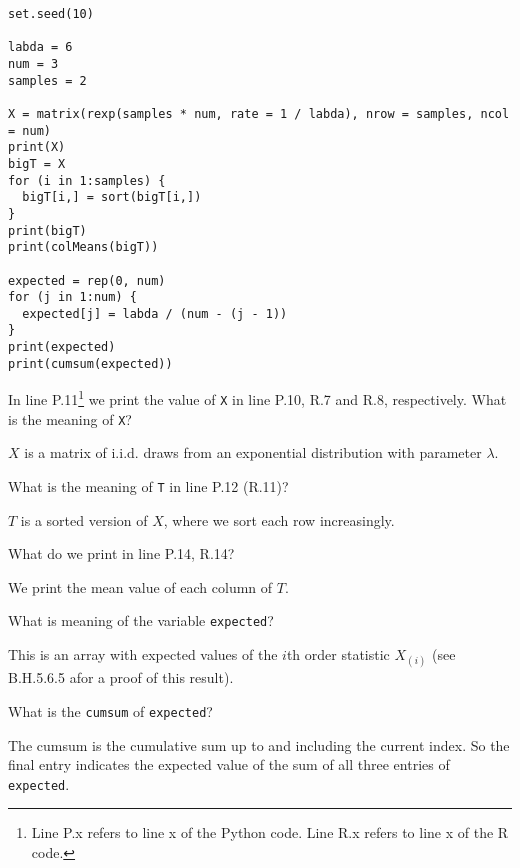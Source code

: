 \documentclass[assignments]{subfiles}
\begin{document}
\begin{verbatim}
set.seed(10)

labda = 6
num = 3
samples = 2

X = matrix(rexp(samples * num, rate = 1 / labda), nrow = samples, ncol = num)
print(X)
bigT = X
for (i in 1:samples) {
  bigT[i,] = sort(bigT[i,])
}
print(bigT)
print(colMeans(bigT))

expected = rep(0, num)
for (j in 1:num) {
  expected[j] = labda / (num - (j - 1))
}
print(expected)
print(cumsum(expected))
\end{verbatim}



\begin{exercise}
In line P.11\footnote{Line P.x refers to line x of the Python code.
  Line R.x refers to line x of the R code.}
we print the value of \texttt{X} in line P.10, R.7 and R.8, respectively.
What is the meaning of \texttt{X}?
\begin{solution}
$X$ is a matrix of i.i.d. draws from an exponential distribution with parameter $\lambda$.
\end{solution}
\end{exercise}

\begin{exercise}
What is the meaning of \texttt{T} in line P.12 (R.11)?
\begin{solution}
$T$ is a sorted version of $X$, where we sort each row increasingly.
\end{solution}
\end{exercise}


\begin{exercise}
What do we print in line P.14, R.14?
\begin{solution}
We print the mean value of each column of $T$.
\end{solution}
\end{exercise}

\begin{exercise}
What is meaning of the variable \texttt{expected}?
\begin{solution}
This is an array with expected values of the $i$th order statistic $X_{(i)}$ (see B.H.5.6.5 afor a proof of this result).
\end{solution}
\end{exercise}

\begin{exercise}
 What is the \texttt{cumsum} of \texttt{expected}?
\begin{solution}
The cumsum is the cumulative sum up to and including the current index. So the final entry indicates the expected value of the sum of all three entries of \verb|expected|.
\end{solution}
\end{exercise}
\end{document}
